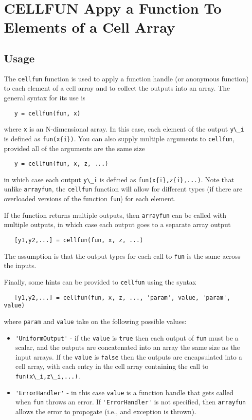 \section{CELLFUN Appy a Function To Elements of a Cell Array}

\subsection{Usage}

The \verb|cellfun| function is used to apply a function handle
(or anonymous function) to each element of a cell array and to
collect the outputs into an array.  The general syntax for its
use is 
\begin{verbatim}
   y = cellfun(fun, x)
\end{verbatim}
where \verb|x| is an N-dimensional array.  In this case, each
element of the output \verb|y\_i| is defined as \verb|fun(x{i})|.  You can
also supply multiple arguments to \verb|cellfun|, provided all of the
arguments are the same size
\begin{verbatim}
   y = cellfun(fun, x, z, ...)
\end{verbatim}
in which case each output \verb|y\_i| is defined as \verb|fun(x{i},z{i},...)|.
Note that unlike \verb|arrayfun|, the \verb|cellfun| function will allow for
different types (if there are overloaded versions of the function
\verb|fun|) for each element.

If the function returns multiple outputs, then \verb|arrayfun| can be
called with multiple outputs, in which case each output goes to
a separate array output
\begin{verbatim}
   [y1,y2,...] = cellfun(fun, x, z, ...)
\end{verbatim}
The assumption is that the output types for each call to \verb|fun| is
the same across the inputs.

Finally, some hints can be provided to \verb|cellfun| using the syntax
\begin{verbatim}
   [y1,y2,...] = cellfun(fun, x, z, ..., 'param', value, 'param', value)
\end{verbatim}
where \verb|param| and \verb|value| take on the following possible values:
\begin{itemize}
\item  \verb|'UniformOutput'| - if the \verb|value| is \verb|true| then each output of \verb|fun|
   must be a scalar, and the outputs are concatenated into an array the same size
   as the input arrays.  If the \verb|value| is \verb|false| then the outputs are encapsulated
   into a cell array, with each entry in the cell array containing the call to 
   \verb|fun(x\_i,z\_i,...)|.

\item  \verb|'ErrorHandler'| - in this case \verb|value| is a function handle that gets called
  when \verb|fun| throws an error.  If \verb|'ErrorHandler'| is not specified, then \verb|arrayfun|
  allows the error to propogate (i.e., and exception is thrown).

\end{itemize}
